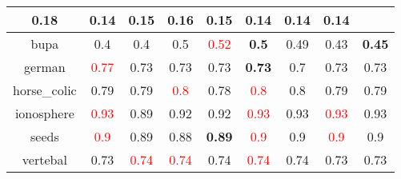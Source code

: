 \documentclass{article}%
\begin{document}
\begin{tabular}{c|cccccccc}
{0.18
}&0.14&0.15&\textbf{0.16}&\textbf{0.15}&0.14&0.14&0.14\\%
\hline%
bupa&0.4&0.4&0.5&\textcolor{red}{ 
0.52
}&\textbf{0.5}&0.49&0.43&\textbf{0.45}\\%
\hline%
german&\textcolor{red}{ 
0.77
}&0.73&0.73&0.73&\textbf{0.73}&0.7&0.73&0.73\\%
\hline%
horse\_colic&0.79&0.79&\textcolor{red}{ 
0.8
}&0.78&\textcolor{red}{ 
0.8
}&0.8&0.79&0.79\\%
\hline%
ionosphere&\textcolor{red}{ 
0.93
}&0.89&0.92&0.92&\textcolor{red}{ 
0.93
}&0.93&\textcolor{red}{ 
0.93
}&0.93\\%
\hline%
seeds&\textcolor{red}{ 
0.9
}&0.89&0.88&\textbf{0.89}&\textcolor{red}{ 
0.9
}&0.9&\textcolor{red}{ 
0.9
}&0.9\\%
\hline%
vertebal&0.73&\textcolor{red}{ 
0.74
}&\textcolor{red}{ 
0.74
}&0.74&\textcolor{red}{ 
0.74
}&0.74&0.73&0.73\\%
\hline%
\end{tabular}

%
\end{document}

